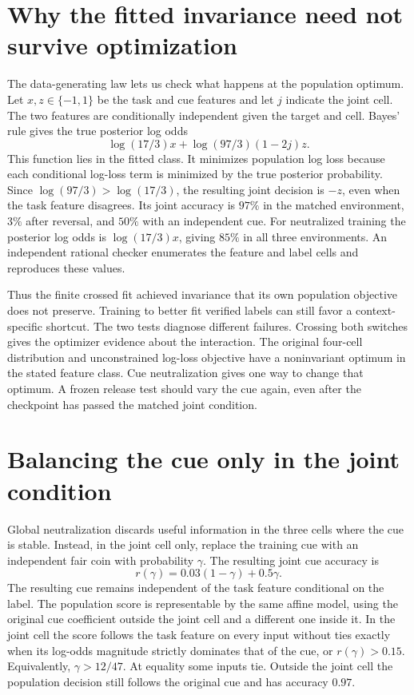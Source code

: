 \documentclass[11pt]{article}
\begin{document}
\section{Why the fitted invariance need not survive optimization}
The data-generating law lets us check what happens at the population
optimum. Let $x,z\in\{-1,1\}$ be the task and cue features and let
$j$ indicate the joint cell. The two features are conditionally
independent given the target and cell. Bayes' rule gives the true
posterior log odds
\[
\log(17/3)x+\log(97/3)(1-2j)z .
\]
This function lies in the fitted class. It minimizes population
log loss because each conditional log-loss term is minimized by
the true posterior probability. Since $\log(97/3)>\log(17/3)$,
the resulting joint decision is $-z$, even when the task feature
disagrees. Its joint accuracy is $97\%$ in the matched environment,
$3\%$ after reversal, and $50\%$ with an independent cue.
For neutralized training the posterior log odds is
$\log(17/3)x$, giving $85\%$ in all three environments.
An independent rational checker enumerates the feature and label
cells and reproduces these values.

Thus the finite crossed fit achieved invariance that its own
population objective does not preserve. Training to better fit
verified labels can still favor a context-specific shortcut.
The two tests diagnose different failures. Crossing both switches
gives the optimizer evidence about the interaction. The original
four-cell distribution and unconstrained log-loss objective have a
noninvariant optimum in the stated feature class. Cue neutralization
gives one way to change that optimum. A frozen release test should
vary the cue again, even after the checkpoint has passed the
matched joint condition.

\section{Balancing the cue only in the joint condition}
Global neutralization discards useful information in the three
cells where the cue is stable. Instead, in the joint cell only,
replace the training cue with an independent fair coin with
probability $\gamma$. The resulting joint cue accuracy is
\[
 r(\gamma)=0.03(1-\gamma)+0.5\gamma.
\]
The resulting cue remains independent of the task feature
conditional on the label.
The population score is representable by the same affine model,
using the original cue coefficient outside the joint cell and a
different one inside it. In the joint cell the score follows the
task feature on every input without ties exactly when its log-odds magnitude
strictly dominates that of the cue, or $r(\gamma)>0.15$.
Equivalently, $\gamma>12/47$. At equality some inputs tie.
Outside the joint cell the population decision still follows the
original cue and has accuracy $0.97$.
\end{document}
